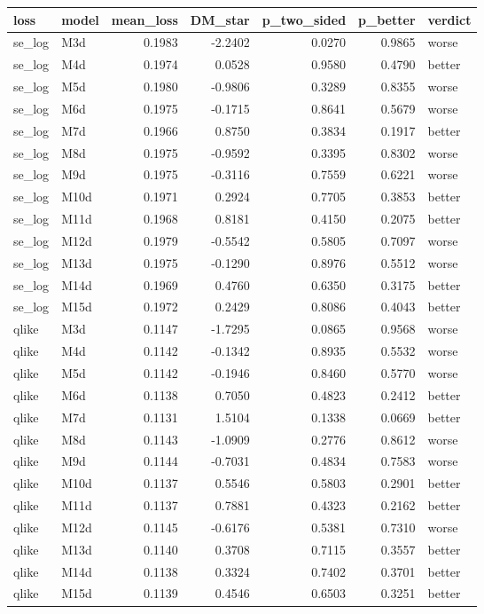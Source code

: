 \begin{tabular}{llrrrrl}
\toprule
loss & model & mean_loss & DM_star & p_two_sided & p_better & verdict \\
\midrule
se_log & M3d & 0.1983 & -2.2402 & 0.0270 & 0.9865 & worse \\
se_log & M4d & 0.1974 & 0.0528 & 0.9580 & 0.4790 & better \\
se_log & M5d & 0.1980 & -0.9806 & 0.3289 & 0.8355 & worse \\
se_log & M6d & 0.1975 & -0.1715 & 0.8641 & 0.5679 & worse \\
se_log & M7d & 0.1966 & 0.8750 & 0.3834 & 0.1917 & better \\
se_log & M8d & 0.1975 & -0.9592 & 0.3395 & 0.8302 & worse \\
se_log & M9d & 0.1975 & -0.3116 & 0.7559 & 0.6221 & worse \\
se_log & M10d & 0.1971 & 0.2924 & 0.7705 & 0.3853 & better \\
se_log & M11d & 0.1968 & 0.8181 & 0.4150 & 0.2075 & better \\
se_log & M12d & 0.1979 & -0.5542 & 0.5805 & 0.7097 & worse \\
se_log & M13d & 0.1975 & -0.1290 & 0.8976 & 0.5512 & worse \\
se_log & M14d & 0.1969 & 0.4760 & 0.6350 & 0.3175 & better \\
se_log & M15d & 0.1972 & 0.2429 & 0.8086 & 0.4043 & better \\
qlike & M3d & 0.1147 & -1.7295 & 0.0865 & 0.9568 & worse \\
qlike & M4d & 0.1142 & -0.1342 & 0.8935 & 0.5532 & worse \\
qlike & M5d & 0.1142 & -0.1946 & 0.8460 & 0.5770 & worse \\
qlike & M6d & 0.1138 & 0.7050 & 0.4823 & 0.2412 & better \\
qlike & M7d & 0.1131 & 1.5104 & 0.1338 & 0.0669 & better \\
qlike & M8d & 0.1143 & -1.0909 & 0.2776 & 0.8612 & worse \\
qlike & M9d & 0.1144 & -0.7031 & 0.4834 & 0.7583 & worse \\
qlike & M10d & 0.1137 & 0.5546 & 0.5803 & 0.2901 & better \\
qlike & M11d & 0.1137 & 0.7881 & 0.4323 & 0.2162 & better \\
qlike & M12d & 0.1145 & -0.6176 & 0.5381 & 0.7310 & worse \\
qlike & M13d & 0.1140 & 0.3708 & 0.7115 & 0.3557 & better \\
qlike & M14d & 0.1138 & 0.3324 & 0.7402 & 0.3701 & better \\
qlike & M15d & 0.1139 & 0.4546 & 0.6503 & 0.3251 & better \\
\bottomrule
\end{tabular}
